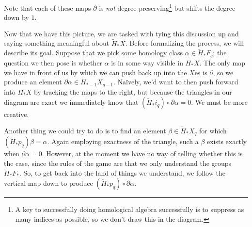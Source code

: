 \begin{center}
\end{center}
Note that each of these maps $\partial$ is \emph{not} degree-preserving\footnote{A key to successfully doing homological algebra successfully is to suppress as many indices as possible, so we don't draw this in the diagram.} but shifts the degree down by $1$.

Now that we have this picture, we are tasked with tying this discussion up and saying something meaningful about $\tilde H_* X$.  Before formalizing the process, we will describe its goal.  Suppose that we pick some homology class $\alpha \in \tilde H_* F_q$; the question we then pose is whether $\alpha$ is in some way visible in $H_* X$.  The only map we have in front of us by which we can push back up into the $X$es is $\partial$, so we produce an element $\partial \alpha \in H_{*-1} X_{q-1}$.  Na\"ively, we'd want to then push forward into $H_* X$ by tracking the maps to the right, but because the triangles in our diagram are exact we immediately know that $(\tilde H_* i_q) \circ \partial \alpha = 0$.  We must be more creative.

Another thing we could try to do is to find an element $\beta \in \tilde H_* X_q$ for which $(\tilde H_* p_q) \beta = \alpha$.  Again employing exactness of the triangle, such a $\beta$ exists exactly when $\partial \alpha = 0$.  However, at the moment we have no way of telling whether this is the case, since the rules of the game are that we only understand the groups $\tilde H_* F_*$.  So, to get back into the land of things we understand, we follow the vertical map down to produce $(\tilde H_* p_q) \circ \partial \alpha$.

